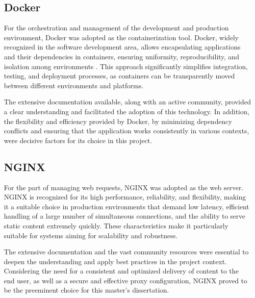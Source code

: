 \subsection{Docker}
For the orchestration and management of the development and production environment, Docker \cite{dockerDocs} was adopted as the containerization tool. Docker, widely recognized in the software development area, allows encapsulating applications and their dependencies in containers, ensuring uniformity, reproducibility, and isolation among environments \cite{dockerOverview}. This approach significantly simplifies integration, testing, and deployment processes, as containers can be transparently moved between different environments and platforms.

The extensive documentation available, along with an active community, provided a clear understanding and facilitated the adoption of this technology. In addition, the flexibility and efficiency provided by Docker, by minimizing dependency conflicts and ensuring that the application works consistently in various contexts, were decisive factors for its choice in this project.

\subsection{NGINX}
For the part of managing web requests, NGINX \cite{nginxDocs} was adopted as the web server. NGINX is recognized for its high performance, reliability, and flexibility, making it a suitable choice in production environments that demand low latency, efficient handling of a large number of simultaneous connections, and the ability to serve static content extremely quickly. These characteristics make it particularly suitable for systems aiming for scalability and robustness.

The extensive documentation and the vast community resources were essential to deepen the understanding and apply best practices in the project context. Considering the need for a consistent and optimized delivery of content to the end user, as well as a secure and effective proxy configuration, NGINX proved to be the preeminent choice for this master's dissertation.






